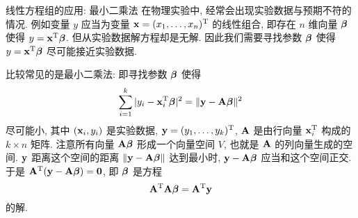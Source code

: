\begin{frame}{线性方程组的应用: 最小二乘法}
	\onslide<+->
	在物理实验中, 经常会出现实验数据与预期不符的情况.
	\onslide<+->
	例如变量 $y$ 应当为变量 $\bfx=(x_1,\dots,x_n)^\rmT$ 的线性组合, 即存在 $n$ 维向量 $\bmb$ 使得 $y=\bfx^\rmT\bmb$.
	\onslide<+->
	但从实验数据解方程却是无解.
	因此我们需要寻找参数 $\bmb$ 使得 $y=\bfx^\rmT\bmb$ 尽可能接近实验数据.

	\onslide<+->
	比较常见的是最小二乘法: 即寻找参数 $\bmb$ 使得
	\[\sum_{i=1}^k |y_i-\bfx_i^\rmT\bmb|^2
	=\|\bfy-\bfA\bmb\|^2\]
	尽可能小, 其中 $(\bfx_i,y_i)$ 是实验数据, $\bfy=(y_1,\dots,y_k)^\rmT$, $\bfA$ 是由行向量 $\bfx_i^\rmT$ 构成的 $k\times n$ 矩阵.
	\onslide<+->
	注意所有向量 $\bfA\bmb$ 形成一个向量空间 $V$, 也就是 $\bfA$ 的列向量生成的空间.
	\onslide<+->
	$\bfy$ 距离这个空间的距离	$\|\bfy-\bfA\bmb\|$ 达到最小时, $\bfy-\bfA\bmb$ 应当和这个空间正交.
	\onslide<+->
	于是 $\bfA^\rmT(\bfy-\bfA\bmb)={\bf0}$, 即 $\bmb$ 是方程
	\[\bfA^\rmT\bfA\bmb=\bfA^\rmT\bfy\]
	的解.
\end{frame}



